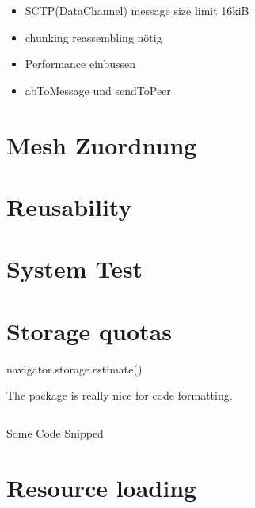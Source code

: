 \begin{itemize}
  \item SCTP(DataChannel) message size limit 16kiB
  \item chunking reassembling nötig
  \item Performance einbussen
  \item abToMessage und sendToPeer
\end{itemize}



\section{Mesh Zuordnung}

\section{Reusability}

\section{System Test}

\section{Storage quotas}
navigator.storage.estimate()

The  package is really nice for code formatting.

\begin{listing}[h]
	\inputminted{ruby}{listings/context-data-transform.rb}
	\caption{Some Code Snipped}
	\label{lst:code-snipped}
\end{listing}

\section{Resource loading}
